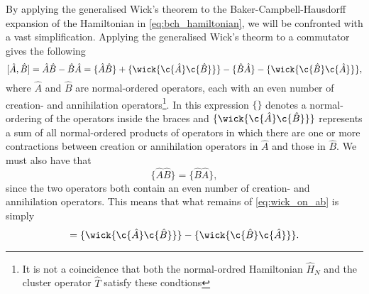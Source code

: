 By applying the generalised Wick's theorem to the Baker-Campbell-Hausdorff 
expansion of the Hamiltonian in \autoref{eq:bch_hamiltonian}, we will be 
confronted with a vast simplification. Applying the generalised Wick's theorm 
to a commutator gives the following 
\begin{equation}
    \label{eq:wick_on_ab}
    [\hat{A}, \hat{B}] = \hat{A} \hat{B} - \hat{B} \hat{A} 
        = \{\hat{A} \hat{B} \} + \{ \wick{\c{\hat{A}} \c{\hat{B}} } \}
        - \{\hat{B} \hat{A} \} - \{ \wick{\c{\hat{B}} \c{\hat{A}} } \},
\end{equation}
where $\hat{A}$ and $\hat{B}$ are normal-ordered operators, each with an even 
number of creation- and annihilation operators\footnote{It is not a coincidence 
that both the normal-ordred Hamiltonian $\hat{H}_N$ and the cluster operator
$\hat{T}$ satisfy these condtions}.
In this expression $\{ \}$ denotes a normal-ordering of the operators inside 
the braces and $\{ \wick{\c{\hat{A}} \c{\hat{B}} } \}$
represents a sum of all normal-ordered products of operators in which there 
are one or more contractions between creation or annihilation operators in 
$\hat{A}$ and those in $\hat{B}$. We must also have that 
\begin{equation}
    \{\hat{A} \hat{B}\} = \{\hat{B} \hat{A}\},
\end{equation}
since the two operators both contain an even number of creation- and
annihilation operators. This means that what remains of \autoref{eq:wick_on_ab}
is simply
\begin{equation}
    [\hat{A}, \hat{B}] = \{ \wick{\c{\hat{A}} \c{\hat{B}} } \}
    - \{ \wick{\c{\hat{B}} \c{\hat{A}} } \}.
\end{equation}

